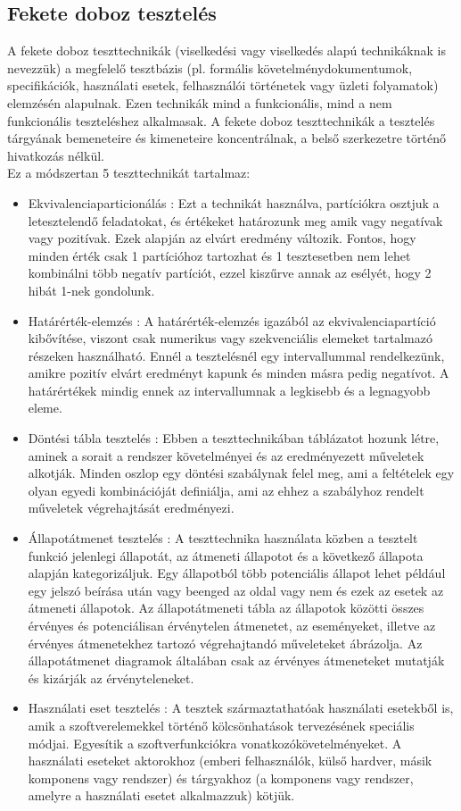 \subsection{Fekete doboz tesztelés} A fekete doboz teszttechnikák (viselkedési vagy viselkedés alapú technikáknak is nevezzük) a megfelelő
tesztbázis (pl. formális követelménydokumentumok, specifikációk, használati esetek, felhasználói történetek
vagy üzleti folyamatok) elemzésén alapulnak. Ezen technikák mind a funkcionális, mind a nem funkcionális
teszteléshez alkalmasak. A fekete doboz teszttechnikák a tesztelés tárgyának bemeneteire és kimeneteire
koncentrálnak, a belső szerkezetre történő hivatkozás nélkül.\\
Ez a módszertan 5 teszttechnikát tartalmaz:
\begin{itemize}
\item Ekvivalenciaparticionálás : Ezt a technikát használva, partíciókra osztjuk a letesztelendő feladatokat, és értékeket határozunk meg amik vagy negatívak vagy pozitívak. Ezek alapján az elvárt eredmény változik. Fontos, hogy minden érték csak 1 partícióhoz tartozhat és 1 tesztesetben nem lehet kombinálni több negatív partíciót, ezzel kiszűrve annak az esélyét, hogy 2 hibát 1-nek gondolunk.
\item Határérték-elemzés : A határérték-elemzés igazából az ekvivalenciapartíció kibővítése, viszont csak numerikus vagy szekvenciális elemeket tartalmazó részeken használható. Ennél a tesztelésnél egy intervallummal rendelkezünk, amikre pozitív elvárt eredményt kapunk és minden másra pedig negatívot. A határértékek mindig ennek az intervallumnak a legkisebb és a legnagyobb eleme.
\item Döntési tábla tesztelés : Ebben a teszttechnikában táblázatot hozunk létre, aminek a sorait a rendszer követelményei és az eredményezett műveletek alkotják. Minden oszlop egy döntési szabálynak felel meg, ami a feltételek egy olyan egyedi kombinációját definiálja, ami az ehhez a szabályhoz rendelt műveletek végrehajtását eredményezi.
\item Állapotátmenet tesztelés : A teszttechnika használata közben a tesztelt funkció jelenlegi állapotát, az átmeneti állapotot és a következő állapota alapján kategorizáljuk. Egy állapotból több potenciális állapot lehet például egy jelszó beírása után vagy beenged az oldal vagy nem és ezek az esetek az átmeneti állapotok. Az állapotátmeneti tábla az állapotok közötti összes érvényes és potenciálisan érvénytelen átmenetet, az eseményeket, illetve az érvényes átmenetekhez tartozó végrehajtandó műveleteket ábrázolja. Az állapotátmenet diagramok általában csak az érvényes átmeneteket mutatják és kizárják az érvényteleneket.
\item Használati eset tesztelés : A tesztek származtathatóak használati esetekből is, amik a szoftverelemekkel történő kölcsönhatások tervezésének speciális módjai. Egyesítik a szoftverfunkciókra vonatkozókövetelményeket. A használati eseteket aktorokhoz (emberi felhasználók, külső hardver, másik komponens vagy rendszer) és tárgyakhoz (a komponens vagy rendszer, amelyre a használati esetet alkalmazzuk) kötjük.
\end{itemize}\cite{syllabus2}

